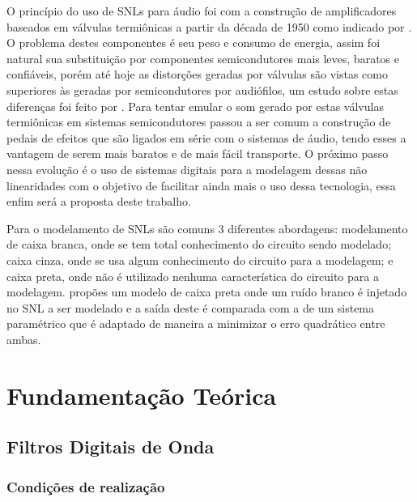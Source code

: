 O princípio do uso de SNLs para áudio foi com a construção de amplificadores baseados em válvulas termiônicas a partir da década de 1950 como indicado por . O problema destes componentes é seu peso e consumo de energia, assim foi natural sua substituição por componentes semicondutores mais leves, baratos e confiáveis, porém até hoje as distorções geradas por válvulas são vistas como superiores às geradas por semicondutores por audiófilos, um estudo sobre estas diferenças foi feito por . Para tentar emular o som gerado por estas válvulas termiônicas em sistemas semicondutores passou a ser comum a construção de pedais de efeitos que são ligados em série com o sistemas de áudio, tendo esses a vantagem de serem mais baratos e de mais fácil transporte. O próximo passo nessa evolução é o uso de sistemas digitais para a modelagem dessas não linearidades com o objetivo de facilitar ainda mais o uso dessa tecnologia, essa enfim será a proposta deste trabalho.

Para o modelamento de SNLs são comuns 3 diferentes abordagens: modelamento de caixa branca, onde se tem total conhecimento do circuito sendo modelado; caixa cinza, onde se usa algum conhecimento do circuito para a modelagem; e caixa preta, onde não é utilizado nenhuma característica do circuito para a modelagem.  propões um modelo de caixa preta onde um ruído branco é injetado no SNL a ser modelado e a saída deste é comparada com a de um sistema paramétrico que é adaptado de maneira a minimizar o erro quadrático entre ambas. 

	\chapter{Fundamentação Teórica}

	\section{Filtros Digitais de Onda}
	
	\subsection{Condições de realização}
	\label{secCondicoesDeRealizacao}
	
